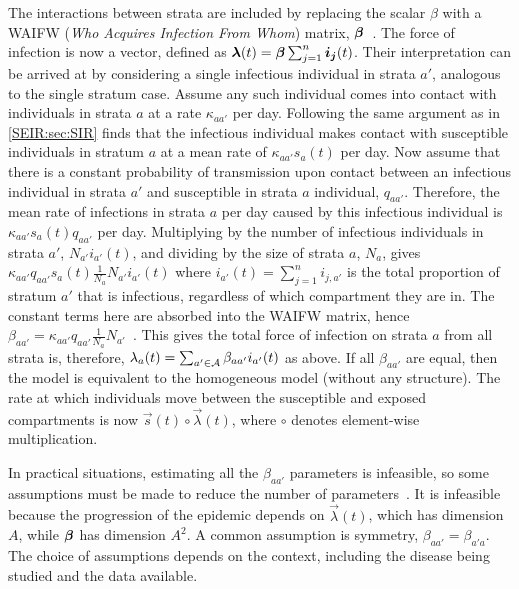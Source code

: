 \documentclass[thesis.tex]{subfiles}
\begin{document}
The interactions between strata are included by replacing the scalar $\beta$ with a WAIFW (\emph{Who Acquires Infection From Whom}) matrix, $\bm{\beta}$~\autocite[58]{keelingModeling}.
The force of infection is now a vector, defined as $\bm\lambda(t) = \bm{\beta} \sum_{j=1}^n \bm{i_j}(t)$.
Their interpretation can be arrived at by considering a single infectious individual in strata $a'$, analogous to the single stratum case.
Assume any such individual comes into contact with individuals in strata $a$ at a rate $\kappa_{aa'}$ per day.
Following the same argument as in \cref{SEIR:sec:SIR} finds that the infectious individual makes contact with susceptible individuals in stratum $a$ at a mean rate of $\kappa_{aa'} s_a(t)$ per day.
Now assume that there is a constant probability of transmission upon contact between an infectious individual in strata $a'$ and susceptible in strata $a$ individual, $q_{aa'}$.
Therefore, the mean rate of infections in strata $a$ per day caused by this infectious individual is $\kappa_{aa'} s_a(t) q_{aa'}$ per day.
Multiplying by the number of infectious individuals in strata $a'$, $N_{a'} i_{a'}(t)$, and dividing by the size of strata $a$, $N_a$, gives $\kappa_{aa'} q_{aa'} s_a(t) \frac{1}{N_a} N_{a'} i_{a'}(t)$ where $i_{a'}(t) = \sum_{j=1}^n i_{j,a'}$ is the total proportion of stratum $a'$ that is infectious, regardless of which compartment they are in.
The constant terms here are absorbed into the WAIFW matrix, hence $\beta_{aa'} = \kappa_{aa'} q_{aa'} \frac{1}{N_a} N_{a'}$~\autocite[section 9.2]{diekmannMathematical}.
This gives the total force of infection on strata $a$ from all strata is, therefore, $\lambda_a(t) = \sum_{a' \in \mathcal{A}} \beta_{aa'} i_{a'}(t)$ as above.
If all $\beta_{aa'}$ are equal, then the model is equivalent to the homogeneous model (\ie without any structure).
The rate at which individuals move between the susceptible and exposed compartments is now $\vec{s}(t) \circ \vec\lambda(t)$, where $\circ$ denotes element-wise multiplication.

In practical situations, estimating all the $\beta_{aa'}$ parameters is infeasible, so some assumptions must be made to reduce the number of parameters~\autocite[176]{andersonInfectious}.
It is infeasible because the progression of the epidemic depends on $\vec{\lambda}(t)$, which has dimension $A$, while $\bm{\beta}$ has dimension $A^2$.
A common assumption is symmetry, \ie $\beta_{aa'} = \beta_{a'a}$.
The choice of assumptions depends on the context, including the disease being studied and the data available.
\end{document}

